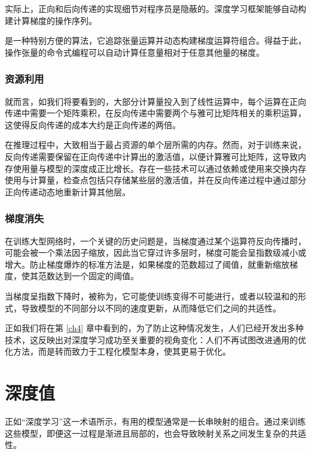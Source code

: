 实际上，正向和后向传递的实现细节对程序员是隐蔽的。深度学习框架能够自动构建计算梯度的操作序列。

\citep{arxiv-1502.05767} 是一种特别方便的算法，它追踪张量运算并动态构建梯度运算符组合。得益于此，操作张量的命令式编程可以自动计算任意量相对于任意其他量的梯度。

\subsubsection*{资源利用}

就而言，如我们将要看到的，大部分计算量投入到了线性运算中，每个运算在正向传递中需要一个矩阵乘积，在反向传递中需要两个与雅可比矩阵相关的乘积运算，这使得反向传递的成本大约是正向传递的两倍。

在推理过程中，大致相当于最占资源的单个层所需的内存。然而，对于训练来说，反向传递需要保留在正向传递中计算出的激活值，以便计算雅可比矩阵，这导致内存使用量与模型的深度成正比增长。存在一些技术可以通过依赖\citep{arxiv-1707.04585}或使用来交换内存使用与计算量，检查点包括只存储某些层的激活值，并在反向传递过程中通过部分正向传递动态地重新计算其他层\citep{arxiv-1604.06174}。

\subsubsection*{梯度消失}

在训练大型网络时，一个关键的历史问题是，当梯度通过某个运算符反向传播时，可能会被一个乘法因子缩放，因此当它穿过许多层时，梯度可能会呈指数级减小或增大。防止梯度爆炸的标准方法是，如果梯度的范数超过了阈值，就重新缩放梯度，使其范数达到一个固定的阈值\citep{pascanu13}。

当梯度呈指数下降时，被称为，它可能使训练变得不可能进行，或者以较温和的形式，导致模型的不同部分以不同的速度更新，从而降低它们之间的共适性\citep{glorot10a}。

正如我们将在第 \ref{ch4} 章中看到的，为了防止这种情况发生，人们已经开发出多种技术，这反映出对深度学习成功至关重要的视角变化：人们不再试图改进通用的优化方法，而是转而致力于工程化模型本身，使其更易于优化。

\section{深度值}\label{sec3.6}

正如``深度学习''这一术语所示，有用的模型通常是一长串映射的组合。通过来训练这些模型，即便这一过程是渐进且局部的，也会导致映射关系之间发生复杂的共适性。


